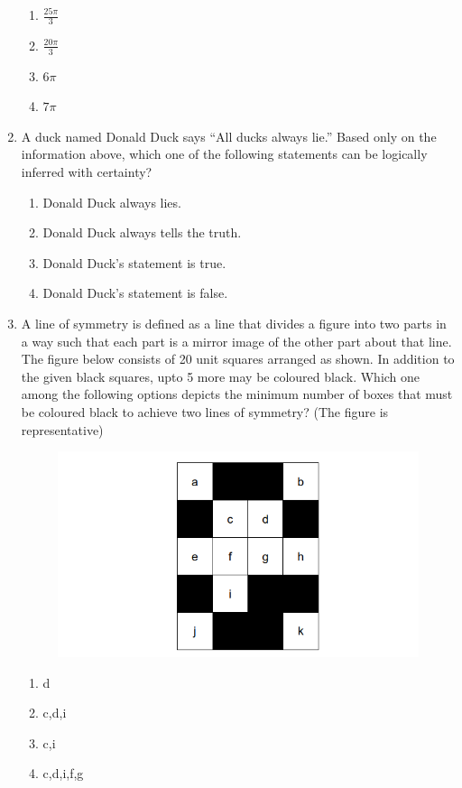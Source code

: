 \documentclass[journal,12pt,onecolumn]{IEEEtran}
\theoremstyle{remark}
\begin{document}
\begin{enumerate}
\begin{enumerate}
\item \Large$\frac{25\pi}{3}$
\item \Large$\frac{20\pi}{3}$
\item \Large$6\pi$
\item \Large$7\pi$
\end{enumerate}

\item A duck named Donald Duck says “All ducks always lie.”
Based only on the information above, which one of the following statements can be logically inferred with certainty?

\hfill{}
\begin{enumerate}
\item Donald Duck always lies.
\item Donald Duck always tells the truth.
\item Donald Duck’s statement is true.
\item Donald Duck’s statement is false. 
\end{enumerate}

\item A line of symmetry is defined as a line that divides a figure into two parts in a way such that each part is a mirror image of the other part about that line. The figure below consists of 20 unit squares arranged as shown. In addition to the given black squares, upto 5 more may be coloured black. Which one among the following options depicts the minimum number of boxes that must be coloured
black to achieve two lines of symmetry? (The figure is representative)

\hfill{}
\begin{figure}[H]
\centering
\includegraphics[width=0.5\linewidth]{figs/q5.png}
\caption*{}
\label{fig:Q.5}
\end{figure}

\begin{enumerate}
\item d
\item c,d,i
\item c,i
\item c,d,i,f,g
\end{enumerate}


\end{enumerate}
\end{document}
